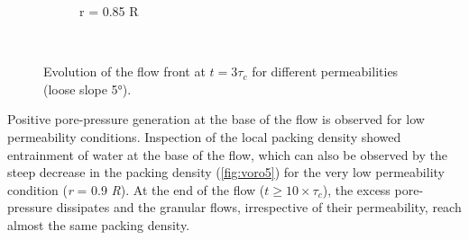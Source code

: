 \begin{figure}
{\begin{subfigure}[b]{0.95\textwidth}
    \caption{r = 0.85 R}
    \label{fig:LBM_660_Slope5_r085}
\end{subfigure}
}\\
\caption{Evolution of the flow front at $t = 3\tau_c$ for different 
permeabilities (loose slope 5\si{\degree}).}
\label{fig:slope_loose_5}
\end{figure}

Positive pore-pressure generation at the base of the flow is observed for low 
permeability conditions. Inspection of the local packing density showed 
entrainment of water at the base of the flow, which can also be observed by the 
steep decrease in the packing density (\cref{fig:voro5}) for the very low 
permeability condition (\textit{r} = 0.9 \textit{R}). At the end of the flow 
($t \ge 10 \times \tau_c$), the excess pore-pressure dissipates and the 
granular flows, irrespective of their permeability, reach almost the same 
packing density.


